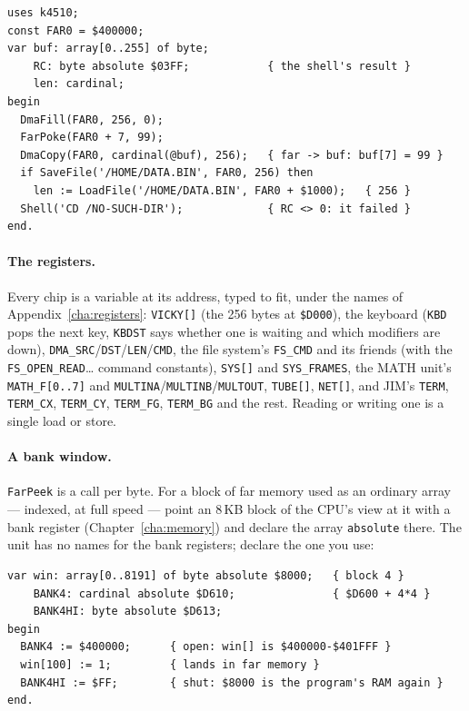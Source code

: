 \begin{verbatim}
uses k4510;
const FAR0 = $400000;
var buf: array[0..255] of byte;
    RC: byte absolute $03FF;            { the shell's result }
    len: cardinal;
begin
  DmaFill(FAR0, 256, 0);
  FarPoke(FAR0 + 7, 99);
  DmaCopy(FAR0, cardinal(@buf), 256);   { far -> buf: buf[7] = 99 }
  if SaveFile('/HOME/DATA.BIN', FAR0, 256) then
    len := LoadFile('/HOME/DATA.BIN', FAR0 + $1000);   { 256 }
  Shell('CD /NO-SUCH-DIR');             { RC <> 0: it failed }
end.
\end{verbatim}

\paragraph{The registers.} Every chip is a variable at its address, typed
to fit, under the names of Appendix~\ref{cha:registers}: \verb|VICKY[]|
(the 256 bytes at \texttt{\$D000}), the keyboard (\verb|KBD| pops the next
key, \verb|KBDST| says whether one is waiting and which modifiers are
down), \verb|DMA_SRC|/\verb|DST|/\verb|LEN|/\verb|CMD|, the file
system's \verb|FS_CMD| and its friends (with the \verb|FS_OPEN_READ|\ldots
command constants), \verb|SYS[]| and \verb|SYS_FRAMES|, the MATH unit's
\verb|MATH_F[0..7]| and \verb|MULTINA|/\verb|MULTINB|/\verb|MULTOUT|,
\verb|TUBE[]|, \verb|NET[]|, and JIM's \verb|TERM|, \verb|TERM_CX|,
\verb|TERM_CY|, \verb|TERM_FG|, \verb|TERM_BG| and the rest. Reading or
writing one is a single load or store.

\paragraph{A bank window.} \verb|FarPeek| is a call per byte. For a
block of far memory used as an ordinary array --- indexed, at full speed
--- point an 8\,KB block of the CPU's view at it with a bank register
(Chapter~\ref{cha:memory}) and declare the array \verb|absolute| there.
The unit has no names for the bank registers; declare the one you use:

\begin{verbatim}
var win: array[0..8191] of byte absolute $8000;   { block 4 }
    BANK4: cardinal absolute $D610;               { $D600 + 4*4 }
    BANK4HI: byte absolute $D613;
begin
  BANK4 := $400000;      { open: win[] is $400000-$401FFF }
  win[100] := 1;         { lands in far memory }
  BANK4HI := $FF;        { shut: $8000 is the program's RAM again }
end.
\end{verbatim}

